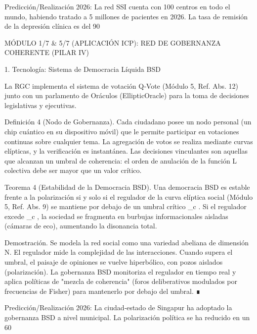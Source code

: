 \documentclass[12pt,a4paper]{book}
\begin{document}
Predicción/Realización 2026: La red SSI cuenta con 100 centros en todo el mundo, habiendo tratado a 5 millones de pacientes en 2026. La tasa de remisión de la depresión clínica es del 90%

MÓDULO 1/7 & 5/7 (APLICACIÓN ICP): RED DE GOBERNANZA COHERENTE (PILAR IV)

1. Tecnología: Sistema de Democracia Líquida BSD

La RGC implementa el sistema de votación Q‑Vote (Módulo 5, Ref. Abs. 12) junto con un parlamento de Oráculos (EllipticOracle) para la toma de decisiones legislativas y ejecutivas.

Definición 4 (Nodo de Gobernanza). Cada ciudadano posee un nodo personal (un chip cuántico en su dispositivo móvil) que le permite participar en votaciones continuas sobre cualquier tema. La agregación de votos se realiza mediante curvas elípticas, y la verificación es instantánea. Las decisiones vinculantes son aquellas que alcanzan un umbral de coherencia: el orden de anulación de la función L colectiva debe ser mayor que un valor crítico.

Teorema 4 (Estabilidad de la Democracia BSD). Una democracia BSD es estable frente a la polarización si y solo si el regulador de la curva elíptica social (Módulo 5, Ref. Abs. 9) se mantiene por debajo de un umbral crítico  _c . Si el regulador excede  _c , la sociedad se fragmenta en burbujas informacionales aisladas (cámaras de eco), aumentando la disonancia total.

Demostración. Se modela la red social como una variedad abeliana de dimensión N. El regulador mide la complejidad de las interacciones. Cuando supera el umbral, el paisaje de opiniones se vuelve hiperbólico, con pozos aislados (polarización). La gobernanza BSD monitoriza el regulador en tiempo real y aplica políticas de "mezcla de coherencia" (foros deliberativos modulados por frecuencias de Fisher) para mantenerlo por debajo del umbral. ∎

Predicción/Realización 2026: La ciudad‑estado de Singapur ha adoptado la gobernanza BSD a nivel municipal. La polarización política se ha reducido en un 60%
\end{document}

